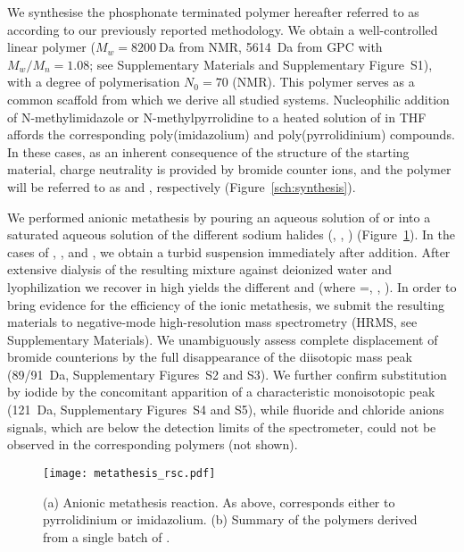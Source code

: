 \documentclass[twoside,twocolumn,9pt]{article}
\newcommand{\figSsec}{S1\xspace}
\newcommand{\figSmassPImBr}{S2\xspace}
\newcommand{\figSmassPPyBr}{S3\xspace}
\newcommand{\figSmassPImI}{S4\xspace}
\newcommand{\figSmassPPyI}{S5\xspace}
\begin{document}
We synthesise the phosphonate terminated polymer hereafter referred to as  according to our previously reported methodology\cite{Srour2014,Appukuttan2012}. We obtain a well-controlled linear polymer ($M_w= \SI{8200}{\dalton}$ from NMR, \SI{5614}{\dalton} from GPC with $M_w/M_n = 1.08$; see Supplementary Materials and Supplementary Figure~\figSsec), with a degree of polymerisation $N_0=70$ (NMR). This polymer serves as a common scaffold from which we derive  all studied systems. Nucleophilic addition of N-methylimidazole or N-methylpyrrolidine to a heated solution of  in THF affords the corresponding poly(imidazolium) and poly(pyrrolidinium) compounds. In these cases, as an inherent consequence of the structure of the starting material, charge neutrality is provided by bromide counter ions, and the polymer will be referred to as  and , respectively (Figure~\ref{sch:synthesis}).



We performed anionic metathesis by pouring an aqueous solution of  or  into a saturated aqueous solution of the different sodium halides (, , ) (Figure~\ref{sch:metathesis}). In the cases of ,  ,  and , we obtain a turbid suspension immediately after addition. After extensive dialysis of the resulting mixture against deionized water and lyophilization we recover in high yields the different  and  (where =, , ). In order to bring evidence for the efficiency of the ionic metathesis, we submit the resulting materials to negative-mode high-resolution mass spectrometry (HRMS, see Supplementary Materials). We unambiguously assess complete displacement of bromide counterions by the full disappearance of the diisotopic mass peak (89/\SI{91}{\dalton}, Supplementary Figures~\figSmassPImBr and \figSmassPPyBr). We further confirm substitution by iodide by the concomitant apparition of a characteristic monoisotopic peak (\SI{121}{\dalton}, Supplementary Figures~\figSmassPImI and \figSmassPPyI), while fluoride and chloride anions signals, which are below the detection limits of the spectrometer, could not be observed in the corresponding polymers (not shown).

\begin{figure}
\texttt{[image: metathesis\_rsc.pdf]}
\caption{(a) Anionic metathesis reaction. As above,  corresponds either to pyrrolidinium or imidazolium. (b) Summary of the polymers derived from a single batch of .}
\label{sch:metathesis}
\end{figure}
\end{document}
